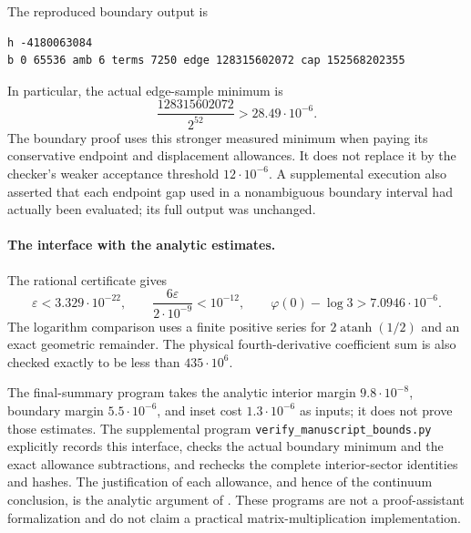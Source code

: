 The reproduced boundary output is
\begin{verbatim}
h -4180063084
b 0 65536 amb 6 terms 7250 edge 128315602072 cap 152568202355
\end{verbatim}
In particular, the actual edge-sample minimum is
\[
 \frac{128315602072}{2^{52}}>28.49\cdot10^{-6}.
\]
The boundary proof uses this stronger measured minimum when paying its
conservative endpoint and displacement allowances.  It does not replace it by
the checker's weaker acceptance threshold $12\cdot10^{-6}$.
A supplemental execution also asserted that each endpoint gap used in a
nonambiguous boundary interval had actually been evaluated; its full output was
unchanged.

\paragraph{The interface with the analytic estimates.}
The rational certificate gives
\[
 \varepsilon<3.329\cdot10^{-22},\qquad
 \frac{6\varepsilon}{2\cdot10^{-9}}<10^{-12},\qquad
 \varphi(0)-\log 3>7.0946\cdot10^{-6}.
\]
The logarithm comparison uses a finite positive series for
$2\operatorname{atanh}(1/2)$ and an exact geometric remainder.
The physical fourth-derivative coefficient sum is also checked exactly to be
less than $435\cdot10^6$.

The final-summary program takes the analytic interior margin
$9.8\cdot10^{-8}$, boundary margin $5.5\cdot10^{-6}$, and inset cost
$1.3\cdot10^{-6}$ as inputs; it does not prove those estimates.  The supplemental
program \texttt{verify\_manuscript\_bounds.py} explicitly records this interface,
checks the actual boundary minimum and the exact allowance subtractions, and
rechecks the complete interior-sector identities and hashes.  The justification
of each allowance, and hence of the continuum conclusion, is the analytic
argument of .  These programs are not a proof-assistant
formalization and do not claim a practical matrix-multiplication implementation.
